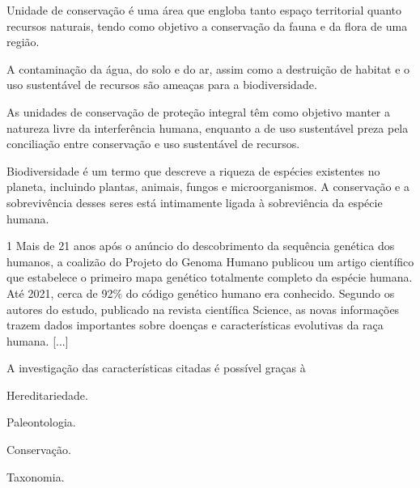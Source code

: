 \begin{boxlist}
\item Unidade de conservação é uma área que engloba tanto espaço
territorial quanto recursos naturais, tendo como objetivo a conservação
da fauna e da flora de uma região. 

\item A contaminação da água, do solo e do ar, assim como a destruição de
habitat e o uso sustentável de recursos são ameaças para a
biodiversidade. 

\item As unidades de conservação de proteção integral têm como objetivo
manter a natureza livre da interferência humana, enquanto a de uso
sustentável preza pela conciliação entre conservação e uso sustentável
de recursos. 

\item Biodiversidade é um termo que descreve a riqueza de espécies
existentes no planeta, incluindo plantas, animais, fungos e
microorganismos. A conservação e a sobrevivência desses seres está
intimamente ligada à sobreviência da espécie humana. 
\end{boxlist}



\num{1}  Mais de 21 anos após o anúncio do descobrimento da sequência genética
  dos humanos, a coalizão do Projeto do Genoma Humano publicou um artigo
  científico que estabelece o primeiro mapa genético totalmente completo
  da espécie humana. 
  Até 2021, cerca de 92\% do código genético humano
  era conhecido. Segundo os autores do estudo, publicado na revista
  científica Science, as novas informações trazem dados importantes
  sobre doenças e características evolutivas da raça humana. [...]


A investigação das características citadas é possível graças à

\begin{escolha}
\item
  Hereditariedade.
\item
  Paleontologia.
\item
  Conservação.
\item
  Taxonomia.
\end{escolha}

